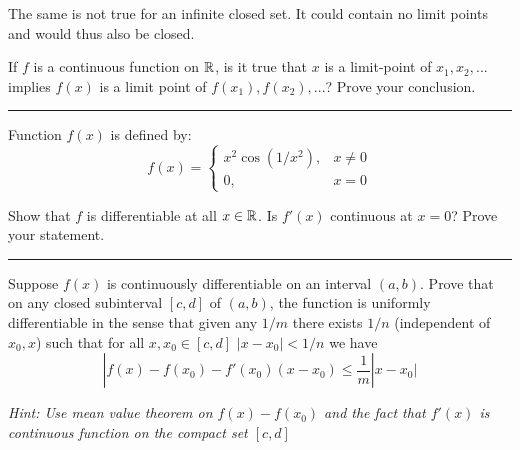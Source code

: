 \documentclass[11pt]{article}
\begin{document}
The same is not true for an infinite closed set. It could contain no limit points and would thus also be closed.






If $f$ is a continuous function on $\mathbb{R}$, is it true that $x$ is a limit-point of $x_1, x_2, ...$ implies $f(x)$ is a limit point of $f(x_1), f(x_2), ...$? Prove your conclusion.

\hrule







Function $f(x)$ is defined by:
$$f(x) = \begin{cases}
x^2 \cos(1/x^2), & x \neq 0\\
0, & x = 0
\end{cases}$$

Show that $f$ is differentiable at all $x \in \mathbb{R}$. Is $f'(x)$ continuous at $x = 0$? Prove your statement.

\hrule








Suppose $f(x)$ is continuously differentiable on an interval $(a,b)$. Prove that on any closed subinterval $[c,d]$ of $(a,b)$, the function is uniformly differentiable in the sense that given any $1/m$ there exists $1/n$ (independent of $x_0, x$) such that for all $x, x_0 \in [c,d]$ $|x - x_0| < 1/n$ we have
$$|f(x) - f(x_0) - f'(x_0)(x-x_0) \leq \frac{1}{m} |x - x_0|$$

\textit{Hint: Use mean value theorem on $f(x) - f(x_0)$ and the fact that $f'(x)$ is continuous function on the compact set $[c,d]$}
\end{document}
